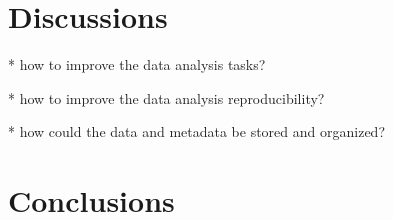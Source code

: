 \documentclass[12pt,a4paper]{amsart}
\numberwithin{equation}{section}
\theoremstyle{plain}
\theoremstyle{definition}
\begin{document}


\section{Discussions}\label{discussions}

* how to improve the data analysis tasks?

* how to improve the data analysis reproducibility?

* how could the data and metadata be stored and organized?

\section{Conclusions}\label{conclusions}



{}

\end{document}

